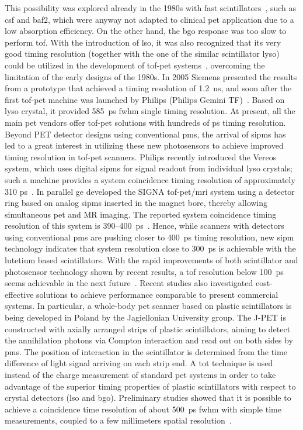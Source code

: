 This possibility was explored already in the 1980s with fast scintillators~\parencite{Ter-Pogossian1982, Lewellen1988}, such as \gls{csf} and \gls{baf2}, which were anyway not adapted to clinical \gls{pet} application due to a low absorption efficiency. On the other hand, the \gls{bgo} response was too slow to perform \gls{tof}. With the introduction of \gls{lso}, it was also recognized that its very good timing resolution (together with the one of the similar scintillator \gls{lyso}) could be utilized in the development of \gls{tof}-\gls{pet} systems~\parencite{Moses1999}, overcoming the limitation of the early designs of the 1980s. In 2005 Siemens presented the results from a prototype that achieved a timing resolution of 1.2~ns, and soon after the first \gls{tof}-\gls{pet} machine was launched by Philips (Philips Gemini TF)~\parencite{Karp2008}.  Based on \gls{lyso} crystal, it provided 585~ps  \gls{fwhm} single timing resolution. At present, all the main \gls{pet} vendors offer \gls{tof}-\gls{pet} solutions with hundreds of ps timing resolution. 
Beyond PET detector designs using conventional \glspl{pm}, the arrival of \glspl{sipm} has led to a great interest in utilizing these new photosensors to achieve improved timing resolution in \gls{tof}-\gls{pet} scanners. Philips recently introduced the Vereos system, which uses digital  \glspl{sipm} for signal readout from individual \gls{lyso} crystals; such a machine provides a system coincidence timing resolution of approximately 310 ps~\parencite{Miller2015}. In parallel \gls{ge} developed the SIGNA \gls{tof}-\gls{pet}/\gls{mri} system using a detector ring based on analog \glspl{sipm} inserted in the magnet bore, thereby
allowing simultaneous \gls{pet} and MR imaging. The reported system coincidence timing resolution of this system is 390–400~ps~\parencite{Levin2013}. Hence, while scanners with detectors using conventional \glspl{pm} are pushing closer to 400~ps timing resolution, new \gls{sipm} technology indicates that system resolution close to 300~ps is achievable with the lutetium based scintillators.
With the rapid improvements of both scintillator and photosensor technology shown by recent results, a \gls{tof} resolution below 100~ps seems achievable in the next future~\parencite{Surti2016, Lecoq2017}.
Recent studies also investigated cost-effective solutions to achieve performance comparable to present commercial systems. In particular, a whole-body \gls{pet} scanner based on plastic scintillators is being developed in Poland by the Jagiellonian University group. The J-PET is constructed with axially arranged strips of plastic scintillators, aiming to detect the annihilation photons via Compton interaction and read out on both sides by \glspl{pm}. The position of interaction in the scintillator is determined from the time difference of light signal arriving on each strip end. A \gls{tot} technique is used instead of the charge measurement of standard \gls{pet} systems in order to take advantage of the superior timing properties of plastic scintillators with respect to crystal detectors (\gls{lso} and \gls{bgo}). Preliminary studies showed that it is possible to achieve a coincidence time resolution of about 500~ps \gls{fwhm} with simple time measurements, coupled to a few millimeters spatial resolution~\parencite{Niedzwiecki2017}.

